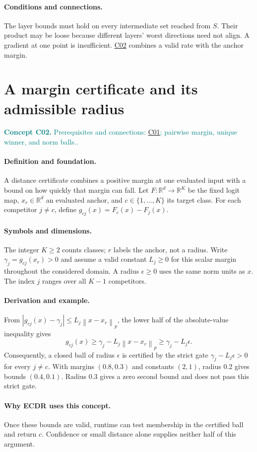 \documentclass[11pt,a4paper]{article}
\newcommand{\R}{\mathbb R}
\newcommand{\norm}[1]{\left\lVert#1\right\rVert}
\newcommand{\abs}[1]{\left\lvert#1\right\rvert}
\newcommand{\conceptid}{Front matter}
\newcommand{\concept}[3]{\clearpage\renewcommand{\conceptid}{#1}%
\section{#2}\label{concept:#1}%
\textcolor{teal}{\textbf{Concept #1.} Prerequisites and connections: #3.}\par
\typeout{ECDR-CONCEPT-START #1 PAGE=\thepage}}
\begin{document}
\paragraph{Conditions and connections.}
The layer bounds must hold on every intermediate set reached from $S$. Their product may be loose because different layers' worst directions need not align. A gradient at one point is insufficient. \hyperref[concept:C02]{C02} combines a valid rate with the anchor margin.
\par\label{endconcept:C01}

\concept{C02}{A margin certificate and its admissible radius}{\hyperref[concept:C01]{C01}; pairwise margin, unique winner, and norm balls.}
\paragraph{Definition and foundation.}
A distance certificate combines a positive margin at one evaluated input with a bound on how quickly that margin can fall. Let $F:\R^d\to\R^K$ be the fixed logit map, $x_r\in\R^d$ an evaluated anchor, and $c\in\{1,\ldots,K\}$ its target class. For each competitor $j\ne c$, define $g_{cj}(x)=F_c(x)-F_j(x)$.
\paragraph{Symbols and dimensions.}
The integer $K\ge2$ counts classes; $r$ labels the anchor, not a radius. Write $\gamma_j=g_{cj}(x_r)>0$ and assume a valid constant $L_j\ge0$ for this scalar margin throughout the considered domain. A radius $\epsilon\ge0$ uses the same norm units as $x$. The index $j$ ranges over all $K-1$ competitors.
\paragraph{Derivation and example.}
From $\abs{g_{cj}(x)-\gamma_j}\le L_j\norm{x-x_r}_p$, the lower half of the absolute-value inequality gives
\[
 g_{cj}(x)\ge\gamma_j-L_j\norm{x-x_r}_p
 \ge\gamma_j-L_j\epsilon.
\]
Consequently, a closed ball of radius $\epsilon$ is certified by the strict gate $\gamma_j-L_j\epsilon>0$ for every $j\ne c$. With margins $(0.8,0.3)$ and constants $(2,1)$, radius 0.2 gives bounds $(0.4,0.1)$. Radius 0.3 gives a zero second bound and does not pass this strict gate.
\paragraph{Why ECDR uses this concept.}
Once these bounds are valid, runtime can test membership in the certified ball and return $c$. Confidence or small distance alone supplies neither half of this argument.
\end{document}
